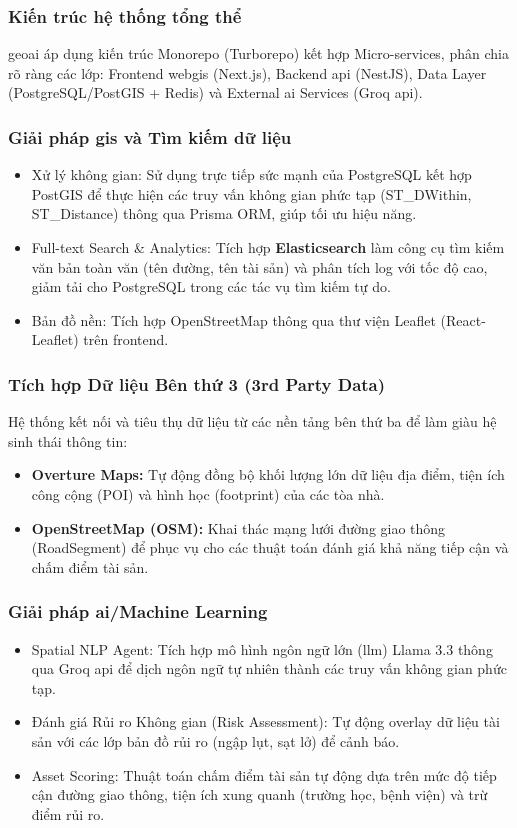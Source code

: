 \subsubsection{Kiến trúc hệ thống tổng thể}
\gls{geoai} áp dụng kiến trúc Monorepo (Turborepo) kết hợp Micro-services, phân chia rõ ràng các lớp: Frontend \gls{webgis} (Next.js), Backend \gls{api} (NestJS), Data Layer (PostgreSQL/PostGIS + Redis) và External \gls{ai} Services (Groq \gls{api}).

\subsubsection{Giải pháp \gls{gis} và Tìm kiếm dữ liệu}
\begin{itemize}
    \item Xử lý không gian: Sử dụng trực tiếp sức mạnh của PostgreSQL kết hợp PostGIS để thực hiện các truy vấn không gian phức tạp (ST\_DWithin, ST\_Distance) thông qua Prisma ORM, giúp tối ưu hiệu năng.
    \item Full-text Search \& Analytics: Tích hợp \textbf{Elasticsearch} làm công cụ tìm kiếm văn bản toàn văn (tên đường, tên tài sản) và phân tích log với tốc độ cao, giảm tải cho PostgreSQL trong các tác vụ tìm kiếm tự do.
    \item Bản đồ nền: Tích hợp OpenStreetMap thông qua thư viện Leaflet (React-Leaflet) trên frontend.
\end{itemize}

\subsubsection{Tích hợp Dữ liệu Bên thứ 3 (3rd Party Data)}
Hệ thống kết nối và tiêu thụ dữ liệu từ các nền tảng bên thứ ba để làm giàu hệ sinh thái thông tin:
\begin{itemize}
    \item \textbf{Overture Maps:} Tự động đồng bộ khối lượng lớn dữ liệu địa điểm, tiện ích công cộng (POI) và hình học (footprint) của các tòa nhà.
    \item \textbf{OpenStreetMap (OSM):} Khai thác mạng lưới đường giao thông (RoadSegment) để phục vụ cho các thuật toán đánh giá khả năng tiếp cận và chấm điểm tài sản.
\end{itemize}

\subsubsection{Giải pháp \gls{ai}/Machine Learning}
\begin{itemize}
    \item Spatial NLP Agent: Tích hợp mô hình ngôn ngữ lớn (\gls{llm}) Llama 3.3 thông qua Groq \gls{api} để dịch ngôn ngữ tự nhiên thành các truy vấn không gian phức tạp.
    \item Đánh giá Rủi ro Không gian (Risk Assessment): Tự động overlay dữ liệu tài sản với các lớp bản đồ rủi ro (ngập lụt, sạt lở) để cảnh báo.
    \item Asset Scoring: Thuật toán chấm điểm tài sản tự động dựa trên mức độ tiếp cận đường giao thông, tiện ích xung quanh (trường học, bệnh viện) và trừ điểm rủi ro.
\end{itemize}

